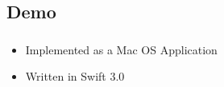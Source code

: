 \subsection{Demo}
\label{subsect:application-demo}

\begin{frame}
  \frametitle{\insertsubsection}
  \begin{itemize}
    \item Implemented as a Mac OS Application
    \item Written in Swift 3.0
  \end{itemize}
\end{frame}
